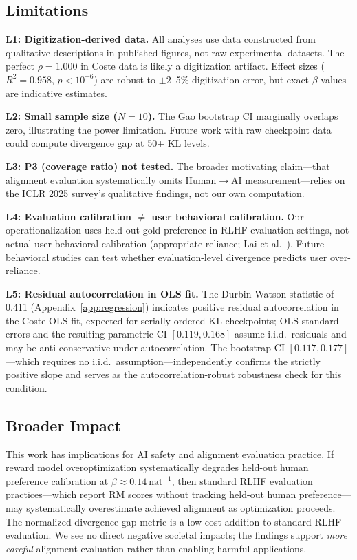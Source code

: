 \subsection{Limitations}

\textbf{L1: Digitization-derived data.} All analyses use data constructed from qualitative descriptions in published figures, not raw experimental datasets. The perfect $\rho = 1.000$ in Coste data is likely a digitization artifact. Effect sizes ($R^2 = 0.958$, $p < 10^{-6}$) are robust to $\pm 2$--5\% digitization error, but exact $\beta$ values are indicative estimates.

\textbf{L2: Small sample size ($N=10$).} The Gao bootstrap CI marginally overlaps zero, illustrating the power limitation. Future work with raw checkpoint data could compute divergence gap at 50+ KL levels.

\textbf{L3: P3 (coverage ratio) not tested.} The broader motivating claim---that alignment evaluation systematically omits Human$\to$AI measurement---relies on the ICLR 2025 survey's qualitative findings, not our own computation.

\textbf{L4: Evaluation calibration $\neq$ user behavioral calibration.} Our operationalization uses held-out gold preference in RLHF evaluation settings, not actual user behavioral calibration (appropriate reliance; Lai et al.~\cite{Lai2021Understanding}). Future behavioral studies can test whether evaluation-level divergence predicts user over-reliance.

\textbf{L5: Residual autocorrelation in OLS fit.} The Durbin-Watson statistic of 0.411 (Appendix~\ref{app:regression}) indicates positive residual autocorrelation in the Coste OLS fit, expected for serially ordered KL checkpoints; OLS standard errors and the resulting parametric CI $[0.119, 0.168]$ assume i.i.d.\ residuals and may be anti-conservative under autocorrelation. The bootstrap CI $[0.117, 0.177]$---which requires no i.i.d.\ assumption---independently confirms the strictly positive slope and serves as the autocorrelation-robust robustness check for this condition.

\subsection{Broader Impact}

This work has implications for AI safety and alignment evaluation practice. If reward model overoptimization systematically degrades held-out human preference calibration at $\beta \approx 0.14\ \text{nat}^{-1}$, then standard RLHF evaluation practices---which report RM scores without tracking held-out human preference---may systematically overestimate achieved alignment as optimization proceeds. The normalized divergence gap metric is a low-cost addition to standard RLHF evaluation. We see no direct negative societal impacts; the findings support \emph{more careful} alignment evaluation rather than enabling harmful applications.
